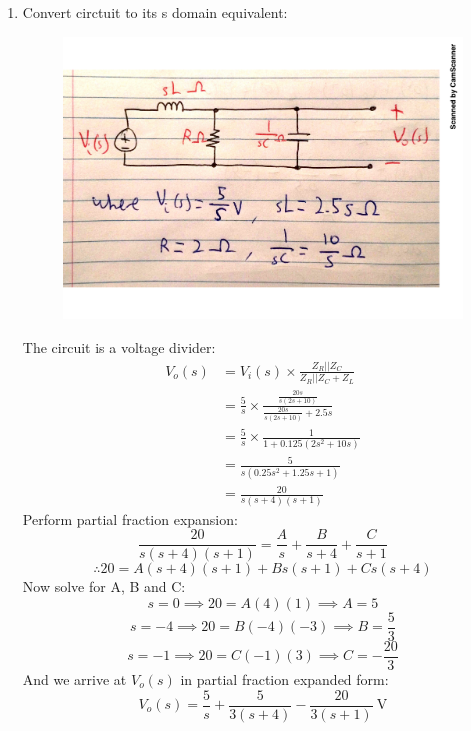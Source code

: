 \begin{enumerate}
	\item{
		Convert circtuit to its s domain equivalent:
		\begin{figure}[H]
			\centering
			\includegraphics[scale=0.55]{q2a.pdf}
		\end{figure}
		The circuit is a voltage divider:
		\begin{align*}
			V_o(s) &= V_i(s) \times \frac{Z_R || Z_C}{Z_R || Z_C + Z_L} \\
			&= \frac{5}{s} \times \frac{\frac{20s}{s(2s+10)}}{\frac{20s}{s(2s+10)}+2.5s} \\
			&= \frac{5}{s} \times \frac{1}{1+0.125(2s^2+10s)} \\
			&= \frac{5}{s(0.25s^2+1.25s+1)} \\
			&= \frac{20}{s(s+4)(s+1)}
		\end{align*}
		Perform partial fraction expansion:
		\begin{equation*}
			\frac{20}{s(s+4)(s+1)} = \frac{A}{s} + \frac{B}{s+4} + \frac{C}{s+1}
		\end{equation*}
		\begin{equation*}
			\therefore 20 = A(s+4)(s+1) + Bs(s+1) + Cs(s+4)
		\end{equation*}
		Now solve for A, B and C:
		\begin{equation*}
			s = 0 \implies 20 = A(4)(1) \implies A = 5
		\end{equation*}
		\begin{equation*}
			s = -4 \implies 20 = B(-4)(-3) \implies B = \frac{5}{3}
		\end{equation*}
		\begin{equation*}
			s = -1 \implies 20 = C(-1)(3) \implies C = -\frac{20}{3}
		\end{equation*}
		And we arrive at $V_o(s)$ in partial fraction expanded form:
		\begin{equation*}
			V_o(s) = \frac{5}{s} + \frac{5}{3(s+4)} - \frac{20}{3(s+1)} \ \mathrm{V}
		\end{equation*}
		\\
	}


\end{enumerate}
